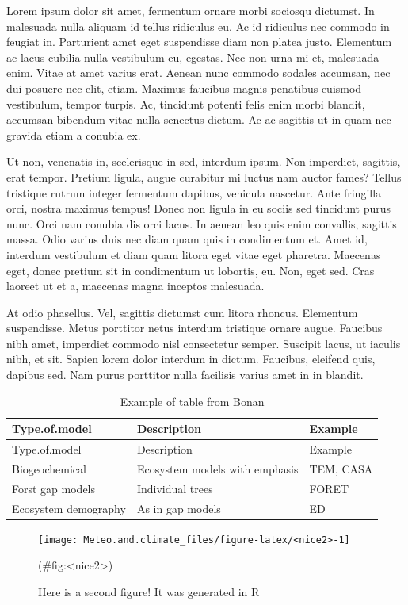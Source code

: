 \documentclass[oneside]{book}
\begin{document}
Lorem ipsum dolor sit amet, fermentum ornare morbi sociosqu dictumst. In
malesuada nulla aliquam id tellus ridiculus eu. Ac id ridiculus nec
commodo in feugiat in. Parturient amet eget suspendisse diam non platea
justo. Elementum ac lacus cubilia nulla vestibulum eu, egestas. Nec non
urna mi et, malesuada enim. Vitae at amet varius erat. Aenean nunc
commodo sodales accumsan, nec dui posuere nec elit, etiam. Maximus
faucibus magnis penatibus euismod vestibulum, tempor turpis. Ac,
tincidunt potenti felis enim morbi blandit, accumsan bibendum vitae
nulla senectus dictum. Ac ac sagittis ut in quam nec gravida etiam a
conubia ex.

Ut non, venenatis in, scelerisque in sed, interdum ipsum. Non imperdiet,
sagittis, erat tempor. Pretium ligula, augue curabitur mi luctus nam
auctor fames? Tellus tristique rutrum integer fermentum dapibus,
vehicula nascetur. Ante fringilla orci, nostra maximus tempus! Donec non
ligula in eu sociis sed tincidunt purus nunc. Orci nam conubia dis orci
lacus. In aenean leo quis enim convallis, sagittis massa. Odio varius
duis nec diam quam quis in condimentum et. Amet id, interdum vestibulum
et diam quam litora eget vitae eget pharetra. Maecenas eget, donec
pretium sit in condimentum ut lobortis, eu. Non, eget sed. Cras laoreet
ut et a, maecenas magna inceptos malesuada.

At odio phasellus. Vel, sagittis dictumst cum litora rhoncus. Elementum
suspendisse. Metus porttitor netus interdum tristique ornare augue.
Faucibus nibh amet, imperdiet commodo nisl consectetur semper. Suscipit
lacus, ut iaculis nibh, et sit. Sapien lorem dolor interdum in dictum.
Faucibus, eleifend quis, dapibus sed. Nam purus porttitor nulla
facilisis varius amet in in blandit.

\begin{longtable}[]{@{}lll@{}}
\caption{\label{tab:unnamed-chunk-2}Example of table from
Bonan}\tabularnewline
\toprule
Type.of.model & Description & Example\tabularnewline
\midrule
\endfirsthead
\toprule
Type.of.model & Description & Example\tabularnewline
\midrule
\endhead
Biogeochemical & Ecosystem models with emphasis & TEM,
CASA\tabularnewline
Forst gap models & Individual trees & FORET\tabularnewline
Ecosystem demography & As in gap models & ED\tabularnewline
\bottomrule
\end{longtable}

\begin{figure}

{\centering \texttt{[image: Meteo.and.climate\_files/figure-latex/<nice2>-1]} 

}

\caption{Here is a second figure! It was generated in R}(\#fig:<nice2>)
\end{figure}
\end{document}
